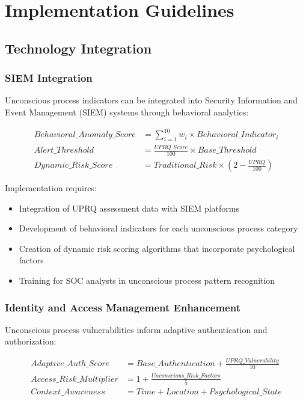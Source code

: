 \documentclass[11pt,a4paper]{article}
\begin{document}
\section{Implementation Guidelines}

\subsection{Technology Integration}

\subsubsection{SIEM Integration}

Unconscious process indicators can be integrated into Security Information and Event Management (SIEM) systems through behavioral analytics:

\begin{align}
Behavioral\_Anomaly\_Score &= \sum_{i=1}^{10} w_i \times Behavioral\_Indicator_i \\
Alert\_Threshold &= \frac{UPRQ\_Score}{100} \times Base\_Threshold \\
Dynamic\_Risk\_Score &= Traditional\_Risk \times (2 - \frac{UPRQ}{100})
\end{align}

Implementation requires:
\begin{itemize}
\item Integration of UPRQ assessment data with SIEM platforms
\item Development of behavioral indicators for each unconscious process category
\item Creation of dynamic risk scoring algorithms that incorporate psychological factors
\item Training for SOC analysts in unconscious process pattern recognition
\end{itemize}

\subsubsection{Identity and Access Management Enhancement}

Unconscious process vulnerabilities inform adaptive authentication and authorization:

\begin{align}
Adaptive\_Auth\_Score &= Base\_Authentication + \frac{UPRQ\_Vulnerability}{10} \\
Access\_Risk\_Multiplier &= 1 + \frac{Unconscious\_Risk\_Factors}{5} \\
Context\_Awareness &= Time + Location + Psychological\_State
\end{align}
\end{document}
